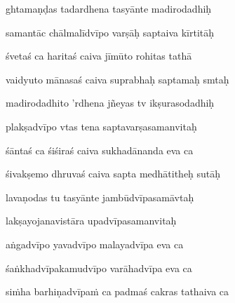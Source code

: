 ghtamaṇḍas tadardhena tasyānte madirodadhiḥ\thinspace{\dandab} \dontdisplaylinenum

samantāc chālmalīdvīpo varṣāḥ saptaiva kīrtitāḥ \veg\dontdisplaylinenum
{}

śvetaś ca haritaś caiva jīmūto rohitas tathā\thinspace{\dandab} \dontdisplaylinenum

vaidyuto mānasaś caiva suprabhaḥ saptamaḥ smtaḥ \veg\dontdisplaylinenum
{}

madirodadhito 'rdhena jñeyas tv ikṣurasodadhiḥ\thinspace{\dandab} \dontdisplaylinenum

plakṣadvīpo vtas tena saptavarṣasamanvitaḥ \veg\dontdisplaylinenum
{}

śāntaś ca śiśiraś caiva sukhadānanda eva ca\thinspace{\dandab} \dontdisplaylinenum

śivakṣemo dhruvaś caiva sapta medhātitheḥ sutāḥ \veg\dontdisplaylinenum
{}

lavaṇodas tu tasyānte jambūdvīpasamāvtaḥ\thinspace{\dandab} \dontdisplaylinenum

lakṣayojanavistāra upadvīpasamanvitaḥ \veg\dontdisplaylinenum
{}

aṅgadvīpo yavadvīpo malayadvīpa eva ca\thinspace{\dandab} \dontdisplaylinenum

śaṅkhadvīpakamudvīpo varāhadvīpa eva ca \veg\dontdisplaylinenum
{}

siṁha barhiṇadvīpaṁ ca padmaś cakras tathaiva ca\thinspace{\dandab} \dontdisplaylinenum

